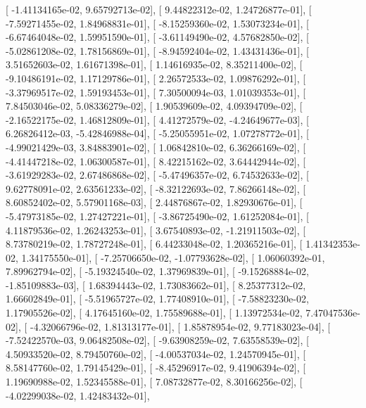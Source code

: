\documentclass{article}
\begin{document}
       [ -1.41134165e-02,   9.65792713e-02],
       [  9.44822312e-02,   1.24726877e-01],
       [ -7.59271455e-02,   1.84968831e-01],
       [ -8.15259360e-02,   1.53073234e-01],
       [ -6.67464048e-02,   1.59951590e-01],
       [ -3.61149490e-02,   4.57682850e-02],
       [ -5.02861208e-02,   1.78156869e-01],
       [ -8.94592404e-02,   1.43431436e-01],
       [  3.51652603e-02,   1.61671398e-01],
       [  1.14616935e-02,   8.35211400e-02],
       [ -9.10486191e-02,   1.17129786e-01],
       [  2.26572533e-02,   1.09876292e-01],
       [ -3.37969517e-02,   1.59193453e-01],
       [  7.30500094e-03,   1.01039353e-01],
       [  7.84503046e-02,   5.08336279e-02],
       [  1.90539609e-02,   4.09394709e-02],
       [ -2.16522175e-02,   1.46812809e-01],
       [  4.41272579e-02,  -4.24649677e-03],
       [  6.26826412e-03,  -5.42846988e-04],
       [ -5.25055951e-02,   1.07278772e-01],
       [ -4.99021429e-03,   3.84883901e-02],
       [  1.06842810e-02,   6.36266169e-02],
       [ -4.41447218e-02,   1.06300587e-01],
       [  8.42215162e-02,   3.64442944e-02],
       [ -3.61929283e-02,   2.67486868e-02],
       [ -5.47496357e-02,   6.74532633e-02],
       [  9.62778091e-02,   2.63561233e-02],
       [ -8.32122693e-02,   7.86266148e-02],
       [  8.60852402e-02,   5.57901168e-03],
       [  2.44876867e-02,   1.82930676e-01],
       [ -5.47973185e-02,   1.27427221e-01],
       [ -3.86725490e-02,   1.61252084e-01],
       [  4.11879536e-02,   1.26243253e-01],
       [  3.67540893e-02,  -1.21911503e-02],
       [  8.73780219e-02,   1.78727248e-01],
       [  6.44233048e-02,   1.20365216e-01],
       [  1.41342353e-02,   1.34175550e-01],
       [ -7.25706650e-02,  -1.07793628e-02],
       [  1.06060392e-01,   7.89962794e-02],
       [ -5.19324540e-02,   1.37969839e-01],
       [ -9.15268884e-02,  -1.85109883e-03],
       [  1.68394443e-02,   1.73083662e-01],
       [  8.25377312e-02,   1.66602849e-01],
       [ -5.51965727e-02,   1.77408910e-01],
       [ -7.58823230e-02,   1.17905526e-02],
       [  4.17645160e-02,   1.75589688e-01],
       [  1.13972534e-02,   7.47047536e-02],
       [ -4.32066796e-02,   1.81313177e-01],
       [  1.85878954e-02,   9.77183023e-04],
       [ -7.52422570e-03,   9.06482508e-02],
       [ -9.63908259e-02,   7.63558539e-02],
       [  4.50933520e-02,   8.79450760e-02],
       [ -4.00537034e-02,   1.24570945e-01],
       [  8.58147760e-02,   1.79145429e-01],
       [ -8.45296917e-02,   9.41906394e-02],
       [  1.19690988e-02,   1.52345588e-01],
       [  7.08732877e-02,   8.30166256e-02],
       [ -4.02299038e-02,   1.42483432e-01],
\end{document}
